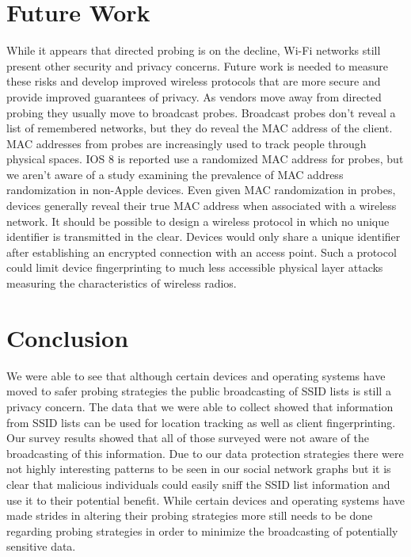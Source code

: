 \documentclass[letterpaper,twocolumn,10pt]{article}
\begin{document}
\section{Future Work}
While it appears that directed probing is on the decline, Wi-Fi networks still present other security and privacy concerns. Future work is needed to measure these risks and develop improved wireless protocols that are more secure and provide improved guarantees of privacy. As vendors move away from directed probing they usually move to broadcast probes. Broadcast probes don't reveal a list of remembered networks, but they do reveal the MAC address of the client. MAC addresses from probes are increasingly used to track people through physical spaces. IOS 8 is reported use a randomized MAC address for probes, but we aren't aware of a study examining the prevalence of MAC address randomization in non-Apple devices. Even given MAC randomization in probes, devices generally reveal their true MAC address when associated with a wireless network. It should be possible to design a wireless protocol in which no unique identifier is transmitted in the clear. Devices would only share a unique identifier after establishing an encrypted connection with an access point. Such a protocol could limit device fingerprinting to much less accessible physical layer attacks measuring the characteristics of wireless radios.

\section{Conclusion}

We were able to see that although certain devices and operating systems have moved 
to safer probing strategies the public broadcasting of SSID lists is still a privacy concern.  
The data that we were able to collect showed that information from SSID lists can be used for 
location tracking as well as client fingerprinting. Our survey results showed that all of those 
surveyed were not aware of the broadcasting of this information. Due to our
data protection strategies there were not highly interesting patterns to be seen in our social network graphs but it is clear that malicious individuals could easily sniff the SSID list information and use 
it to their potential benefit. While certain devices and operating systems have made strides in 
altering their probing strategies more still needs to be done regarding probing strategies in order to 
minimize the broadcasting of potentially sensitive data. 





\end{document}
